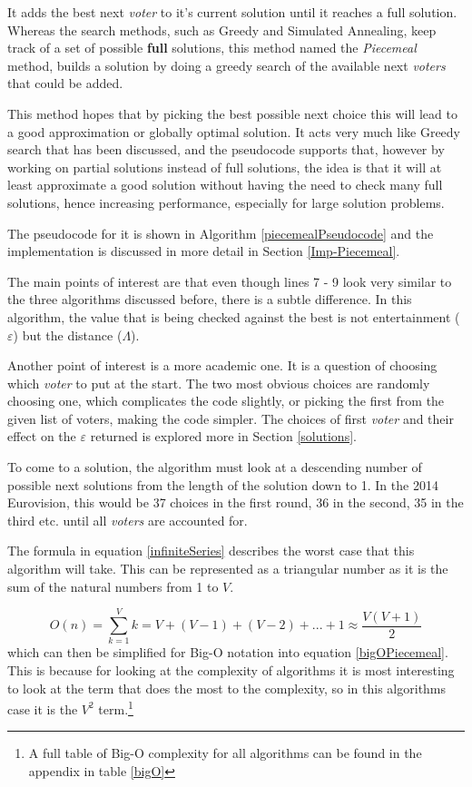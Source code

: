 \documentclass[12pt]{report}
\begin{document}
It adds the best next \textit{voter} to it's current solution until it reaches a full solution. Whereas the search methods, such as Greedy and Simulated Annealing, keep track of a set of possible \textbf{full} solutions, this method named the \textit{Piecemeal} method, builds a solution by doing a greedy search of the available next \textit{voters} that could be added.

This method hopes that by picking the best possible next choice this will lead to a good approximation or globally optimal solution. It acts very much like Greedy search that has been discussed, and the pseudocode supports that, however by working on partial solutions instead of full solutions, the idea is that it will at least approximate a good solution without having the need to check many full solutions, hence increasing performance, especially for large solution problems.

The pseudocode for it is shown in Algorithm \ref{piecemealPseudocode} and the implementation is discussed in more detail in Section \ref{Imp-Piecemeal}.

The main points of interest are that even though lines 7 - 9 look very similar to the three algorithms discussed before, there is a subtle difference. In this algorithm, the value that is being checked against the best is not entertainment ($\varepsilon$) but the distance ($\Lambda$).

Another point of interest is a more academic one. It is a question of choosing which \textit{voter} to put at the start. The two most obvious choices are randomly choosing one, which complicates the code slightly, or picking the first from the given list of voters, making the code simpler. The choices of first \textit{voter} and their effect on the $\varepsilon$ returned is explored more in Section \ref{solutions}.

To come to a solution, the algorithm must look at a descending number of possible next solutions from the length of the solution down to 1. In the 2014 Eurovision, this would be 37 choices in the first round, 36 in the second, 35 in the third etc. until all \textit{voters} are accounted for.

The formula in equation \ref{infiniteSeries} describes the worst case that this algorithm will take. This can be represented as a triangular number\cite{triangularNumber} as it is the sum of the natural numbers from 1 to $V$.

\begin{equation}\label{infiniteSeries}
	O(n) = \sum_{k=1}^{V} k =  V + (V-1) + (V-2) + ... + 1 \approx \frac{V(V+1)}{2}
\end{equation}
which can then be simplified for Big-O notation into equation \ref{bigOPiecemeal}. This is because for looking at the complexity of algorithms it is most interesting to look at the term that does the most to the complexity, so in this algorithms case it is the $V^2$ term.\footnote{A full table of Big-O complexity for all algorithms can be found in the appendix in table \ref{bigO}}
\end{document}
